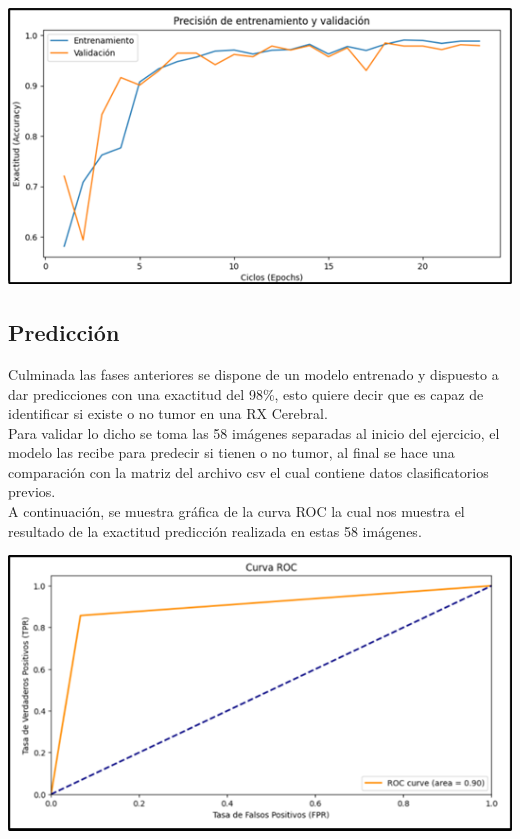 \documentclass[12pt,twoside,titlepage]{ingenius}
\newenvironment{figura}
  {\par\bigskip\noindent\minipage{\linewidth}}
  {\endminipage\par\bigskip}
\begin{document}
\begin{multicols}{2}
\begin{figura}%
	\centering
	\includegraphics[scale=0.5]{figuras/fig11.png}
	\label{figura11}
\end{figura}

\subsection{Predicción}
Culminada las fases anteriores se dispone de un modelo entrenado y dispuesto a dar predicciones con una exactitud del 98\%, esto quiere decir que es capaz de identificar si existe o no tumor en una RX Cerebral.\\
Para validar lo dicho se toma las 58 imágenes separadas al inicio del ejercicio, el modelo las recibe para predecir si tienen o no tumor, al final se hace una comparación con la matriz del archivo csv el cual contiene datos clasificatorios previos.\\
A continuación, se muestra gráfica de la curva ROC la cual nos muestra el resultado de la exactitud predicción realizada en estas 58 imágenes.

\begin{figura}%
	\centering
	\includegraphics[scale=0.5]{figuras/fig12.png}
	\label{figura12}
\end{figura}


\end{multicols}
\end{document}
